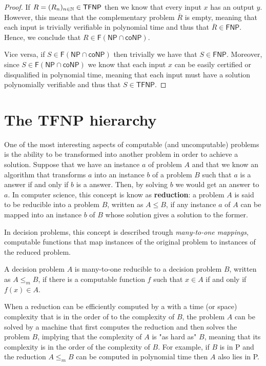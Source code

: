 \begin{proof}
    If $R = (R_n)_{n \in \mathbb{N}} \in \textsf{TFNP}$ then we know that every input $x$ has an output $y$. However, this means that the complementary problem $\overline{R}$ is empty, meaning that each input is trivially verifiable in polynomial time and thus that $\overline{R} \in \textsf{FNP}$. Hence, we conclude that $R \in \mathsf{F}(\mathsf{NP} \cap \mathsf{coNP})$.
    
    Vice versa, if $S \in \mathsf{F}(\mathsf{NP} \cap \mathsf{coNP})$ then trivially we have that $S \in \mathsf{FNP}$. Moreover, since $S \in \mathsf{F}(\mathsf{NP} \cap \mathsf{coNP})$ we know that each input $x$ can be easily certified or disqualified in polynomial time, meaning that each input must have a solution polynomially verifiable and thus that $S \in \mathsf{TFNP}$.

\end{proof}

\newpage

\section{The \textsf{TFNP} hierarchy}

One of the most interesting aspects of computable (and uncomputable) problems is the ability to be transformed into another problem in order to achieve a solution. Suppose that we have an instance $a$ of problem $A$ and that we know an algorithm that transforms $a$ into an instance $b$ of a problem $B$ such that $a$ is a  answer if and only if $b$ is a  answer. Then, by solving $b$ we would get an answer to $a$. In computer science, this concept is know as \textbf{reduction}: a problem $A$ is said to be reducible into a problem $B$, written as $A \leq B$, if any instance $a$ of $A$ can be mapped into an instance $b$ of $B$ whose solution gives a solution to the former.

In decision problems, this concept is described trough \textit{many-to-one mappings}, computable functions that map instances of the original problem to instances of the reduced problem.

\begin{definition}
    A decision problem $A$ is many-to-one reducible to a decision problem $B$, written as $A \leq_m B$, if there is a computable function $f$ such that $x \in A$ if and only if $f(x) \in A$. 
\end{definition}

When a reduction can be efficiently computed by a \TM with a time (or space) complexity that is in the order of to the complexity of $B$, the problem $A$ can be solved by a machine that first computes the reduction and then solves the problem $B$, implying that the complexity of $A$ is "as hard as" $B$, meaning that its complexity is in the order of the complexity of $B$. For example, if $B$ is in \textsf{P} and the reduction $A \leq_m B$ can be computed in polynomial time then $A$ also lies in \textsf{P}.

